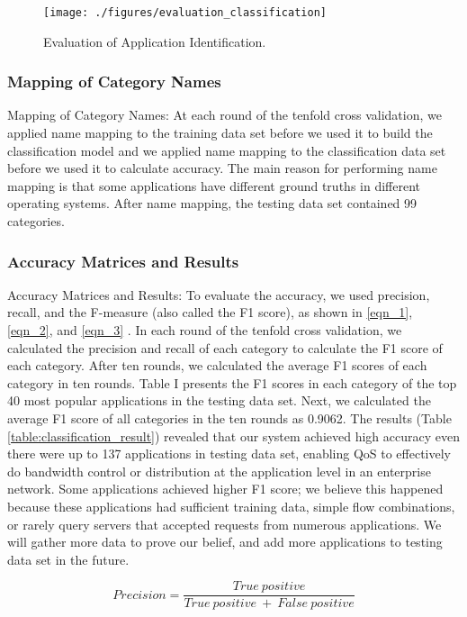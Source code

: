 \documentclass[10pt,journal]{IEEEtran}
\begin{document}
\begin{figure}[!t]
\centering
\texttt{[image: ./figures/evaluation\_classification]}
\caption{Evaluation of Application Identification.}
\label{fig:evaluation_classification}
\end{figure}

\subsubsection{Mapping of Category Names}
Mapping of Category Names: At each round of the tenfold cross validation, we applied name mapping to the training data set before we used it to build the classification model and we applied name mapping to the classification data set before we used it to calculate accuracy. The main reason for performing name mapping is that some applications have different ground truths in different operating systems. After name mapping, the testing data set contained 99 categories.

\subsubsection{Accuracy Matrices and Results}
Accuracy Matrices and Results: To evaluate the accuracy, we used precision, recall, and the F-measure (also called the F1 score), as shown in \ref{eqn_1}, \ref{eqn_2}, and \ref{eqn_3} \cite{muc4}. In each round of the tenfold cross validation, we calculated the precision and recall of each category to calculate the F1 score of each category. After ten rounds, we calculated the average F1 scores of each category in ten rounds. Table I presents the F1 scores in each category of the top 40 most popular applications in the testing data set. Next, we calculated the average F1 score of all categories in the ten rounds as 0.9062. The results (Table \ref{table:classification_result}) revealed that our system achieved high accuracy even there were up to 137 applications in testing data set, enabling QoS to effectively do bandwidth control or distribution at the application level in an enterprise network. Some applications achieved higher F1 score; we believe this happened because these applications had sufficient training data, simple flow combinations, or rarely query servers that accepted requests from numerous applications. We will gather more data to prove our belief, and add more applications to testing data set in the future.

\begin{equation}
\label{eqn_1}
Precision = \dfrac{True\ positive}{True\ positive\ +\ False\ positive}
\end{equation}
\end{document}
